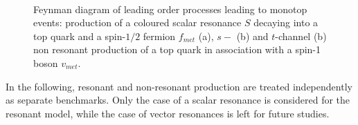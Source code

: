 \begin{figure}[!h!tpd]
\centering
{}\textwidth
{}\\\vspace{\baselineskip}
\caption
{
Feynman diagram of leading order processes leading to monotop events: production of
a coloured scalar resonance $S$ decaying into a top quark and a spin-$1/2$ fermion $f_{met}$ (a),
$s-$ (b) and $t$-channel (b) non resonant production of a top quark in association with
a spin-1 boson $v_{met}$.
}
\label{fig:feyn_prod}
\end{figure}

In the following, resonant and non-resonant production are treated independently as separate benchmarks. 
Only the case of a scalar resonance is considered for the resonant model, while the case of vector resonances is left for future studies. 

